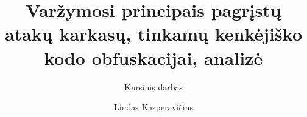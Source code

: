 


\renewcommand{\figurename}{}
\renewcommand{\tablename}{}
\renewcommand\thefigure{\arabic{figure} pav.}
\renewcommand\thetable{\arabic{table} lentelė.}
\newcommand{\enquote}[1]{„#1“}
\usepackage{pifont}
\newcommand{\cmark}{\ding{51}}%
\newcommand{\xmark}{\ding{55}}%

\usepackage{graphicx}
\usepackage{listings}
\usepackage[
    backend=biber,
    style=numeric,
    sorting=ynt
]{biblatex}
\usepackage{algorithm,algorithmic}
\usepackage{caption}
\usepackage{subfig}

\usepackage{biblatex}
\usepackage{hyperref}
\usepackage{siunitx}
\usepackage{booktabs}


\newenvironment{criteriaTable}{
    \newcommand{\rowLast}[1]{##1}
    \newcommand{\row}[1]{##1 \\}
    \newcommand{\tbl}[1]{\gdef\Table{##1}}

    \def\Table{}
}{
    \begin{table}[h]
        \centering
        \begin{tabular}{l|c|c|c|S}
            \row{
            \textbf{Karkasas} & 
            \textbf{K-1}      & 
            \textbf{K-2}      & 
            \textbf{K-3}      & 
                \textbf{K-4}*
            } \midrule
            \Table{}
        \end{tabular}
    \end{table}
}


\captionsetup{justification=centering}


\title[]{Varžymosi principais pagrįstų atakų karkasų, tinkamų kenkėjiško kodo obfuskacijai, analizė}
\subtitle[]{Kursinis darbas}
\author[Liudas Kasperavičius]{Liudas Kasperavičius}
\date{}



